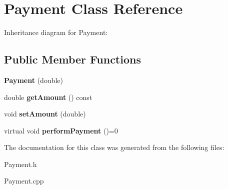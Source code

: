 \hypertarget{classPayment}{}\section{Payment Class Reference}
\label{classPayment}


Inheritance diagram for Payment\+:
\subsection*{Public Member Functions}
\begin{DoxyCompactItemize}
\item 
{\bfseries Payment} (double)\hypertarget{classPayment_abe05f968db46b0211379eeee357ef58d}{}\label{classPayment_abe05f968db46b0211379eeee357ef58d}

\item 
double {\bfseries get\+Amount} () const \hypertarget{classPayment_a9852315e5da04ac1efb40fe78c1d1ab6}{}\label{classPayment_a9852315e5da04ac1efb40fe78c1d1ab6}

\item 
void {\bfseries set\+Amount} (double)\hypertarget{classPayment_ae967c922e523959e20933da449e5d0fd}{}\label{classPayment_ae967c922e523959e20933da449e5d0fd}

\item 
virtual void {\bfseries perform\+Payment} ()=0\hypertarget{classPayment_afc011ab4bc8dee83b184bdc056d4c2a9}{}\label{classPayment_afc011ab4bc8dee83b184bdc056d4c2a9}

\end{DoxyCompactItemize}


The documentation for this class was generated from the following files\+:\begin{DoxyCompactItemize}
\item 
Payment.\+h\item 
Payment.\+cpp\end{DoxyCompactItemize}

